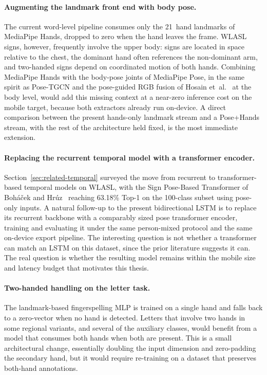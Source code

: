 \paragraph{Augmenting the landmark front end with body pose.}
The current word-level pipeline consumes only the 21~hand landmarks
of MediaPipe Hands, dropped to zero when the hand leaves the frame.
WLASL signs, however, frequently involve the upper body: signs are
located in space relative to the chest, the dominant hand often
references the non-dominant arm, and two-handed signs depend on
coordinated motion of both hands. Combining MediaPipe Hands with
the body-pose joints of MediaPipe Pose, in the same spirit as
Pose-TGCN and the pose-guided RGB fusion of
Hosain et~al.~\cite{hosain2021fusion} at the body level, would add
this missing context at a near-zero inference cost on the mobile
target, because both extractors
already run on-device. A direct comparison between the present
hands-only landmark stream and a Pose+Hands stream, with the rest
of the architecture held fixed, is the most immediate extension.

\paragraph{Replacing the recurrent temporal model with a
transformer encoder.}
Section~\ref{sec:related-temporal} surveyed the move from recurrent
to transformer-based temporal models on WLASL, with the Sign
Pose-Based Transformer of Boh\'a\v{c}ek and
Hr\'uz~\cite{bohacek2022spoter} reaching 63.18\% Top-1 on the
100-class subset using pose-only inputs. A natural follow-up to the
present bidirectional LSTM is to replace its recurrent backbone
with a comparably sized pose transformer encoder, training and
evaluating it under the same person-mixed protocol and the same
on-device export pipeline. The interesting question is not whether
a transformer can match an LSTM on this dataset, since the prior
literature suggests it can. The real question is whether the
resulting model remains within the mobile size and latency budget
that motivates this thesis.

\paragraph{Two-handed handling on the letter task.}
The landmark-based fingerspelling MLP is trained on a single hand
and falls back to a zero-vector when no hand is detected. Letters
that involve two hands in some regional variants, and several of
the auxiliary classes, would benefit from a model that consumes
both hands when both are present. This is a small architectural
change, essentially doubling the input dimension and zero-padding
the secondary hand, but it would require re-training on a dataset
that preserves both-hand annotations.

